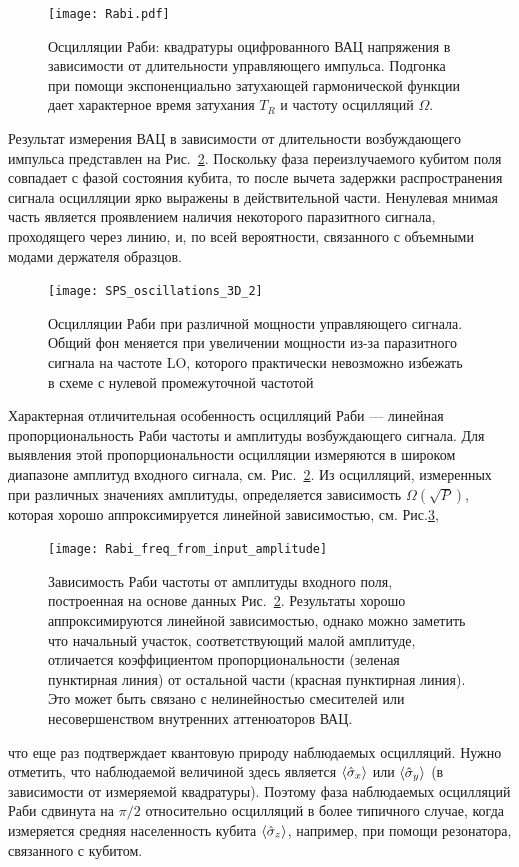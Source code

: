 \begin{figure}[h]
	\centering
	\texttt{[image: Rabi.pdf]}
	\caption[Раби осцилляции кубита в линии, полученные при измерении рассеянного поля]{Осцилляции Раби: квадратуры оцифрованного ВАЦ напряжения в зависимости от длительности управляющего импульса. Подгонка при помощи экспоненциально затухающей гармонической функции дает характерное время затухания $T_R$ и частоту осцилляций $\Omega$.}
	\label{fig: rabi_ocs}
\end{figure} 

Результат измерения ВАЦ в зависимости от длительности возбуждающего импульса представлен на Рис.~\ref{fig: rabi_ocs}. Поскольку фаза переизлучаемого кубитом поля совпадает с фазой состояния кубита, то после вычета задержки распространения сигнала осцилляции ярко выражены в действительной части. Ненулевая мнимая часть является проявлением наличия некоторого паразитного сигнала, проходящего через линию,  и, по всей вероятности, связанного с объемными модами держателя образцов.  
\begin{figure}[h]
	\centering
	\texttt{[image: SPS\_oscillations\_3D\_2]}
	\caption[Зависимость Раби осцилляций от мощности сигнала]{Осцилляции Раби при различной мощности управляющего сигнала. Общий фон меняется при увеличении мощности из-за паразитного сигнала на частоте LO, которого практически невозможно избежать в схеме с нулевой промежуточной частотой}
	\label{fig: rabi_ocs}
\end{figure} 
Характерная отличительная особенность осцилляций Раби --- линейная пропорциональность Раби частоты и амплитуды возбуждающего сигнала. Для выявления этой пропорциональности осцилляции измеряются в широком диапазоне амплитуд входного сигнала, см. Рис.~\ref{fig: rabi_ocs}. Из осцилляций, измеренных при различных значениях амплитуды, определяется зависимость $\Omega(\sqrt{P})$, которая хорошо аппроксимируется линейной зависимостью, см. Рис.\ref{img: Rabi_from_amp_2},
\begin{figure}[h]
	\centering
	\texttt{[image: Rabi\_freq\_from\_input\_amplitude]} 
	\caption[Зависимость Раби частоты от амплитуды входного поля.]{Зависимость Раби частоты от амплитуды входного поля, построенная на основе данных  Рис.~\ref{fig: rabi_ocs}. Результаты хорошо аппроксимируются линейной зависимостью, однако можно заметить что начальный участок, соответствующий малой амплитуде, отличается коэффициентом пропорциональности (зеленая пунктирная линия) от остальной части (красная пунктирная линия). Это может быть связано с нелинейностью смесителей или несовершенством внутренних аттенюаторов ВАЦ.}
	\label{img: Rabi_from_amp_2}  
\end{figure}
что еще раз подтверждает квантовую природу наблюдаемых осцилляций. Нужно отметить, что наблюдаемой величиной здесь является $\braket{\hat{\sigma}_x}$ или $\braket{\hat{\sigma}_y}$ (в зависимости от измеряемой квадратуры). Поэтому фаза наблюдаемых осцилляций Раби сдвинута на $\pi/2$ относительно осцилляций в более типичного случае, когда измеряется средняя населенность кубита $\braket{\hat{\sigma}_z}$, например, при помощи резонатора, связанного с кубитом. 

